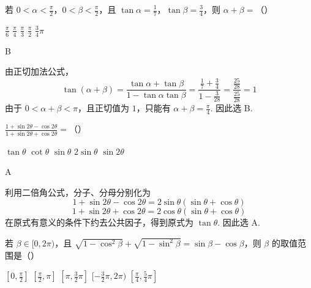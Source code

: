 \documentclass[UTF8,a4paper,oneside,11pt]{ctexbook}
\begin{document}
\begin{problem}

若 \(0 < \alpha < \frac{\pi}{2}\)，\(0 < \beta < \frac{\pi}{2}\)，且 \(\tan \alpha = \frac{1}{7}\)，\(\tan \beta = \frac{3}{4}\)，则 \(\alpha + \beta =\)（\quad）

\choicesfive
    {\(\frac{\pi}{6}\)}
    {\(\frac{\pi}{4}\)}
    {\(\frac{\pi}{3}\)}
    {\(\frac{\pi}{2}\)}
    {\(\frac{3}{4}\pi\)}
\end{problem}

\begin{answer}
B
\end{answer}

\begin{solution}
由正切加法公式，
\[
\tan(\alpha+\beta)=\frac{\tan\alpha+\tan\beta}{1-\tan\alpha\tan\beta}
=\frac{\frac{1}{7}+\frac{3}{4}}{1-\frac{3}{28}}=\frac{\frac{25}{28}}{\frac{25}{28}}=1
\]
由于 \(0<\alpha+\beta<\pi\)，且正切值为 \(1\)，只能有 \(\alpha+\beta=\frac{\pi}{4}\). 因此选 B.
\end{solution}


\begin{problem}

\(\frac{1 + \sin 2\theta - \cos 2\theta}{1 + \sin 2\theta + \cos 2\theta} =\)（\quad）

\choicesfive
    {\(\tan\theta\)}
    {\(\cot\theta\)}
    {\(\sin\theta\)}
    {\(2\sin\theta\)}
    {\(\sin 2\theta\)}
\end{problem}

\begin{answer}
A
\end{answer}

\begin{solution}
利用二倍角公式，分子、分母分别化为
\[
1+\sin2\theta-\cos2\theta=2\sin\theta(\sin\theta+\cos\theta)
\]
\[
1+\sin2\theta+\cos2\theta=2\cos\theta(\sin\theta+\cos\theta)
\]
在原式有意义的条件下约去公共因子，得到原式为 \(\tan\theta\). 因此选 A.
\end{solution}


\begin{problem}

若 \(\beta \in [0, 2\pi)\)，且 \(\sqrt{1 - \cos^2\beta} + \sqrt{1 - \sin^2\beta} = \sin \beta - \cos \beta\)，则 \(\beta\) 的取值范围是（\quad）

\choicesfive
    {\([0, \frac{\pi}{2}]\)}
    {\([\frac{\pi}{2}, \pi]\)}
    {\([\pi, \frac{3}{2}\pi]\)}
    {\([-\frac{3}{2}\pi, 2\pi)\)}
    {\([\frac{\pi}{4}, \frac{5}{4}\pi]\)}
\end{problem}
\end{document}

